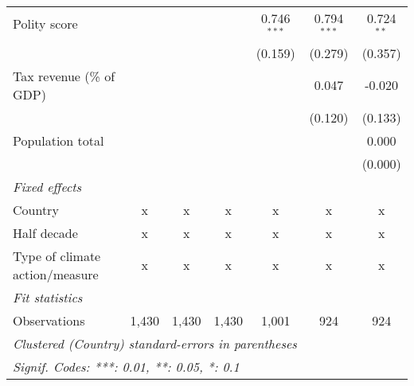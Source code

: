 \begin{tabular}{lcccccc}
   Polity score                                              &               &               &                & 0.746$^{***}$ & 0.794$^{***}$ & 0.724$^{**}$\\   
                                                             &               &               &                & (0.159)       & (0.279)       & (0.357)\\   
   Tax revenue (\% of GDP)                                   &               &               &                &               & 0.047         & -0.020\\   
                                                             &               &               &                &               & (0.120)       & (0.133)\\   
   Population total                                          &               &               &                &               &               & 0.000\\   
                                                             &               &               &                &               &               & (0.000)\\   
   \emph{Fixed effects}\\
   Country                                                   & x             & x             & x              & x             & x             & x\\  
   Half decade                                               & x             & x             & x              & x             & x             & x\\  
   Type of climate action/measure                            & x             & x             & x              & x             & x             & x\\  
   \midrule \emph{Fit statistics}\\
   Observations                                              & 1,430         & 1,430         & 1,430          & 1,001         & 924           & 924\\  
   \midrule
   \multicolumn{7}{l}{\emph{Clustered (Country) standard-errors in parentheses}}\\
   \multicolumn{7}{l}{\emph{Signif. Codes: ***: 0.01, **: 0.05, *: 0.1}}\\
\end{tabular}
\par\endgroup


